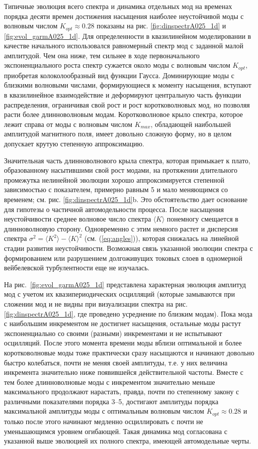Типичные эволюция всего спектра и динамика отдельных мод на временах порядка десяти времен достижения насыщения наиболее неустойчивой моды с волновым числом $K_{opt}\approx0.28$ показаны на рис. \ref{fig:dinspectrA025_1d} и \ref{fig:evol_garmA025_1d}. 
Для определенности в квазилинейном моделировании в качестве начального использовался равномерный спектр мод с заданной малой амплитудой. 
Чем она ниже, тем сильнее в ходе первоначального экспоненциального роста спектр сужается около моды с волновым числом $K_{opt}$, приобретая колоколообразный вид функции Гаусса. 
Доминирующие моды с близкими волновыми числами, формирующиеся к моменту насыщения, вступают в квазилинейное взаимодействие и деформируют центральную часть функции распределения, ограничивая свой рост и рост коротковолновых мод, но позволяя расти более длинноволновым модам. 
Коротковолновое крыло спектра, которое лежит справа от моды с волновым числом $K_{max}$, обладающей наибольшей амплитудой магнитного поля, имеет довольно сложную форму, но в целом допускает крутую степенную аппроксимацию.

Значительная часть длинноволнового крыла спектра, которая примыкает к плато, образованному насытившими свой рост модами, на протяжении длительного промежутка нелинейной эволюции хорошо аппроксимируется степенной зависимостью с показателем, примерно равным 5 и мало меняющимся со временем; см. рис. \ref{fig:dinspectrA025_1d}b. 
Это обстоятельство дает основание для гипотезы о частичной автомодельности процесса. 
После насыщения неустойчивости среднее волновое число спектра $\langle K\rangle$ понемногу смещается в длинноволновую сторону. 
Одновременно с этим немного растет и дисперсия спектра $\sigma^2=\langle K^2\rangle-\langle K\rangle^2$ (см. (\ref{eq:angles})), которая снижалась на линейной стадии развития неустойчивости. 
Возможная связь указанной эволюции спектра с формированием или разрушением долгоживущих токовых слоев в одномерной вейбелевской турбулентности еще не изучалась.

На рис.~\ref{fig:evol_garmA025_1d} представлена характерная эволюция амплитуд мод с учетом их квазипериодических осцилляций (которые замываются при сложении мод и не видны при визуализации спектра на рис. \ref{fig:dinspectrA025_1d}, где проведено усреднение по близким модам). 
Пока мода с наибольшим инкрементом не достигнет насыщения, остальные моды растут экспоненциально со своими (разными) инкрементами и не испытывают осцилляций. 
После этого момента времени моды вблизи оптимальной и более коротковолновые моды тоже практически сразу насыщаются и начинают довольно быстро колебаться, почти не меняя своей амплитуды, т.е. у них величина инкремента значительно ниже появившейся действительной частоты. 
Вместе с тем более длинноволновые моды с инкрементом значительно меньше максимального продолжают нарастать, правда, почти по степенному закону с различными показателями порядка 3--5, достигают амплитуды порядка максимальной амплитуды моды с оптимальным волновым числом $K_{opt}\approx0.28$ и только после этого начинают медленно осциллировать с почти не уменьшающимся уровнем огибающей. 
Такая динамика мод согласована с указанной выше эволюцией их полного спектра, имеющей автомодельные черты.


